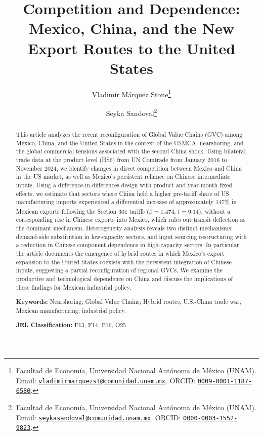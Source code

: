 \documentclass[11pt]{article}
\title{Competition and Dependence: Mexico, China, and the New Export
       Routes to the United States}
\author{
  Vladimir Márquez Stone\thanks{%
    Facultad de Economía, Universidad Nacional Autónoma de México (UNAM).
    Email: \href{mailto:vladimirmarquezst@comunidad.unam.mx}%
    {\texttt{vladimirmarquezst@comunidad.unam.mx}}.
    ORCID: \href{https://orcid.org/0009-0001-1187-6580}%
    {\texttt{0009-0001-1187-6580}}.}
  \and
  Seyka Sandoval\thanks{%
    Facultad de Economía, Universidad Nacional Autónoma de México (UNAM).
    Email: \href{mailto:seykasandoval@comunidad.unam.mx}%
    {\texttt{seykasandoval@comunidad.unam.mx}}.
    ORCID: \href{https://orcid.org/0000-0003-1552-9823}%
    {\texttt{0000-0003-1552-9823}}.}
}
\date{}
\begin{document}
\maketitle    
\begin{abstract}
This article analyzes the recent reconfiguration of Global Value Chains (GVC) among Mexico, China, and the United States in the context of the USMCA, nearshoring, and the global commercial tensions associated with the second China shock. Using bilateral trade data at the product level (HS6) from UN Comtrade from January 2016 to November 2024, we identify changes in direct competition between Mexico and China in the US market, as well as Mexico's persistent reliance on Chinese intermediate inputs. Using a difference-in-differences design with product and year-month fixed effects, we estimate that sectors where China held a higher pre-tariff share of US manufacturing imports experienced a differential increase of approximately 147\% in Mexican exports following the Section 301 tariffs ($\hat{\beta} = 1.474$, $t = 9.14$), without a corresponding rise in Chinese exports into Mexico, which rules out transit deflection as the dominant mechanism. Heterogeneity analysis reveals two distinct mechanisms: demand-side substitution in low-capacity sectors, and input sourcing restructuring with a reduction in Chinese component dependence in high-capacity sectors. In particular, the article documents the emergence of hybrid routes in which Mexico's export expansion to the United States coexists with the persistent integration of Chinese inputs, suggesting a partial reconfiguration of regional GVCs. We examine the productive and technological dependence on China and discuss the implications of these findings for Mexican industrial policy.

\medskip
\textbf{Keywords:} Nearshoring; Global Value Chains; Hybrid routes;
U.S.-China trade war; Mexican manufacturing; industrial policy.

\medskip
\textbf{JEL Classification:} F13, F14, F16, O25
\end{abstract}
\end{document}

